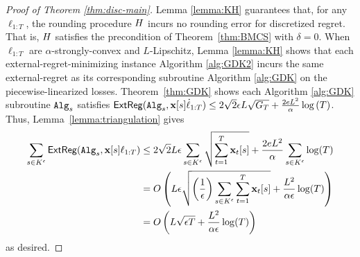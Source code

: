 \begin{proof}[Proof of Theorem \ref{thm:disc-main}]
    Lemma \ref{lemma:KH} guarantees that, for any $\ell_{1:T}$, the rounding procedure $H$ incurs no rounding error for discretized regret.  That is, $H$ satisfies the precondition of Theorem~\ref{thm:BMCS} with $\delta = 0$. When $\ell_{1:T}$ are $\alpha$-strongly-convex and $L$-Lipschitz, Lemma \ref{lemma:KH} shows that each external-regret-minimizing instance Algorithm \ref{alg:GDK2} incurs the same external-regret as its corresponding subroutine Algorithm \ref{alg:GDK} on the piecewise-linearized losses.  Theorem~\ref{thm:GDK} shows each Algorithm \ref{alg:GDK} subroutine $\mathtt{Alg}_s$ satisfies $\mathsf{ExtReg}(\mathtt{Alg}_s, \mathbf{x}[s]\dot{\ell}_{1:T}) \leq 2\sqrt{2}\epsilon L\sqrt{G_T} + \frac{2eL^2}{\alpha}\log\left(T\right)$.  Thus, Lemma~\ref{lemma:triangulation} gives \begin{align*}
        \sum_{s \in K^{\epsilon}} \mathsf{ExtReg}(\mathtt{Alg}_s, \mathbf{x}[s]\ell_{1:T}) & \leq 2\sqrt{2}L \epsilon \sum_{s \in K^{\epsilon}}\sqrt{\sum_{t=1}^T \mathbf{x}_t[s]}+ \frac{2eL^2}{\alpha}\sum_{s \in K^{\epsilon}} \log(T)\\
        &= O\left(L\epsilon\sqrt{\left(\frac{1}{\epsilon}\right)\sum_{s \in K^{\epsilon}}\sum_{t=1}^T \mathbf{x}_t[s]} +\frac{L^2}{\alpha\epsilon}\log(T)\right)\\
        &= O\left(L\sqrt{\epsilon T}+\frac{L^2}{\alpha \epsilon}\log(T)\right)
    \end{align*}
    as desired.
\end{proof}

